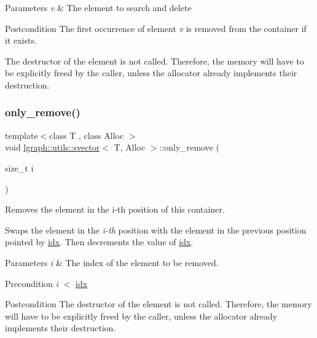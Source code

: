 \begin{DoxyParams}{Parameters}
{\em v} & The element to search and delete \\
\hline
\end{DoxyParams}
\begin{DoxyPostcond}{Postcondition}
The first occurrence of element {\itshape v} is removed from the container if it exists.
\end{DoxyPostcond}
The destructor of the element is not called. Therefore, the memory will have to be explicitly freed by the caller, unless the allocator already implements their destruction. \mbox{\label{classlgraph_1_1utils_1_1svector_afd0bed68cf8eb4c07c8553c555fb2f3b}} 
\subsubsection{\texorpdfstring{only\+\_\+remove()}{only\_remove()}}
{\footnotesize\ttfamily template$<$class T , class Alloc $>$ \\
void \hyperlink{classlgraph_1_1utils_1_1svector}{lgraph\+::utils\+::svector}$<$ T, Alloc $>$\+::only\+\_\+remove (\begin{DoxyParamCaption}\item[{size\+\_\+t}]{i }\end{DoxyParamCaption})\hspace{0.3cm}{\ttfamily [private]}}



Removes the element in the i-\/th position of this container. 

Swaps the element in the {\itshape i-\/th} position with the element in the previous position pointed by \hyperlink{classlgraph_1_1utils_1_1svector_a7ef963c079c7dc8a6a559ceef81a241f}{idx}. Then decrements the value of \hyperlink{classlgraph_1_1utils_1_1svector_a7ef963c079c7dc8a6a559ceef81a241f}{idx}.


\begin{DoxyParams}{Parameters}
{\em i} & The index of the element to be removed. \\
\hline
\end{DoxyParams}
\begin{DoxyPrecond}{Precondition}
{\itshape i} $<$ \hyperlink{classlgraph_1_1utils_1_1svector_a7ef963c079c7dc8a6a559ceef81a241f}{idx} 
\end{DoxyPrecond}
\begin{DoxyPostcond}{Postcondition}
The destructor of the element is not called. Therefore, the memory will have to be explicitly freed by the caller, unless the allocator already implements their destruction. 
\end{DoxyPostcond}
\mbox{\label{classlgraph_1_1utils_1_1svector_a6943d4e89de5500202b9b01433b0f466}} 
